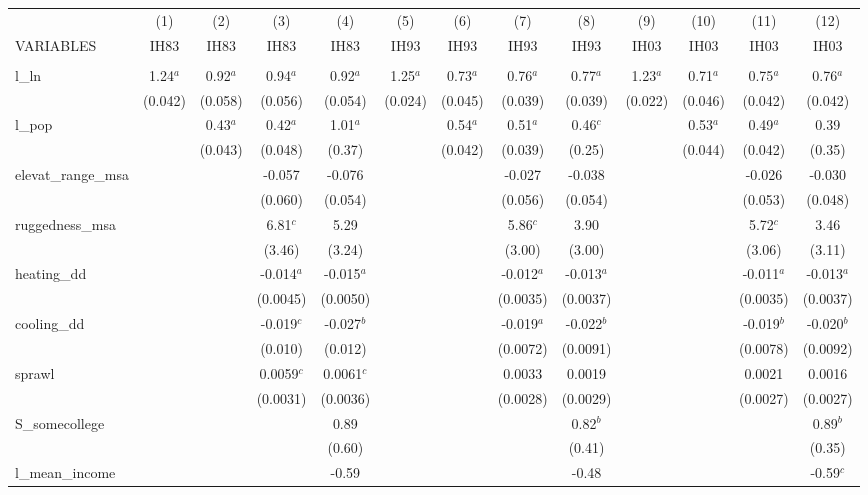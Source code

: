 \documentclass[]{article}
\begin{document}
\begin{tabular}{lcccccccccccc} \hline
 & (1) & (2) & (3) & (4) & (5) & (6) & (7) & (8) & (9) & (10) & (11) & (12) \\
VARIABLES & IH83 & IH83 & IH83 & IH83 & IH93 & IH93 & IH93 & IH93 & IH03 & IH03 & IH03 & IH03 \\ \hline
 &  &  &  &  &  &  &  &  &  &  &  &  \\
l\_ln & 1.24$^a$ & 0.92$^a$ & 0.94$^a$ & 0.92$^a$ & 1.25$^a$ & 0.73$^a$ & 0.76$^a$ & 0.77$^a$ & 1.23$^a$ & 0.71$^a$ & 0.75$^a$ & 0.76$^a$ \\
 & (0.042) & (0.058) & (0.056) & (0.054) & (0.024) & (0.045) & (0.039) & (0.039) & (0.022) & (0.046) & (0.042) & (0.042) \\
l\_pop &  & 0.43$^a$ & 0.42$^a$ & 1.01$^a$ &  & 0.54$^a$ & 0.51$^a$ & 0.46$^c$ &  & 0.53$^a$ & 0.49$^a$ & 0.39 \\
 &  & (0.043) & (0.048) & (0.37) &  & (0.042) & (0.039) & (0.25) &  & (0.044) & (0.042) & (0.35) \\
elevat\_range\_msa &  &  & -0.057 & -0.076 &  &  & -0.027 & -0.038 &  &  & -0.026 & -0.030 \\
 &  &  & (0.060) & (0.054) &  &  & (0.056) & (0.054) &  &  & (0.053) & (0.048) \\
ruggedness\_msa &  &  & 6.81$^c$ & 5.29 &  &  & 5.86$^c$ & 3.90 &  &  & 5.72$^c$ & 3.46 \\
 &  &  & (3.46) & (3.24) &  &  & (3.00) & (3.00) &  &  & (3.06) & (3.11) \\
heating\_dd &  &  & -0.014$^a$ & -0.015$^a$ &  &  & -0.012$^a$ & -0.013$^a$ &  &  & -0.011$^a$ & -0.013$^a$ \\
 &  &  & (0.0045) & (0.0050) &  &  & (0.0035) & (0.0037) &  &  & (0.0035) & (0.0037) \\
cooling\_dd &  &  & -0.019$^c$ & -0.027$^b$ &  &  & -0.019$^a$ & -0.022$^b$ &  &  & -0.019$^b$ & -0.020$^b$ \\
 &  &  & (0.010) & (0.012) &  &  & (0.0072) & (0.0091) &  &  & (0.0078) & (0.0092) \\
sprawl &  &  & 0.0059$^c$ & 0.0061$^c$ &  &  & 0.0033 & 0.0019 &  &  & 0.0021 & 0.0016 \\
 &  &  & (0.0031) & (0.0036) &  &  & (0.0028) & (0.0029) &  &  & (0.0027) & (0.0027) \\
S\_somecollege &  &  &  & 0.89 &  &  &  & 0.82$^b$ &  &  &  & 0.89$^b$ \\
 &  &  &  & (0.60) &  &  &  & (0.41) &  &  &  & (0.35) \\
l\_mean\_income &  &  &  & -0.59 &  &  &  & -0.48 &  &  &  & -0.59$^c$ \\

\end{tabular}
\end{document}
